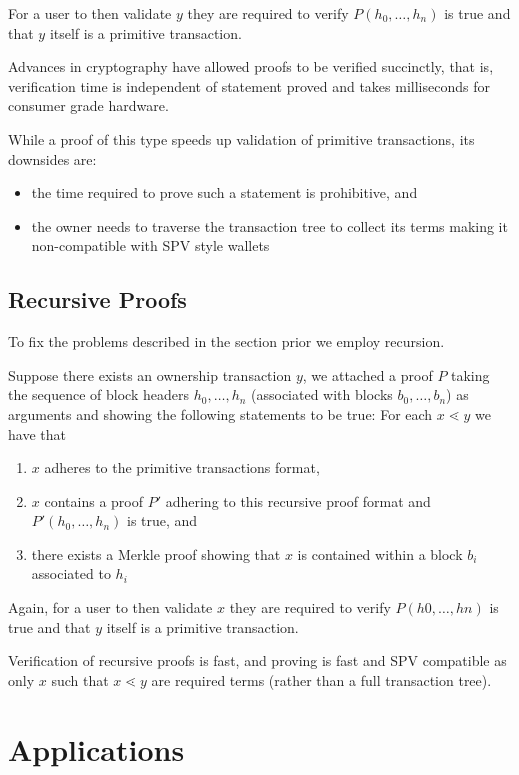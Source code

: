 \documentclass[9pt,oneside]{amsart}
\begin{document}
\begin{multicols}{2}
For a user to then validate $y$ they are required to verify $P(h_{0}, \dots, h_{n})$ is true and that $y$ itself is a primitive transaction.

Advances in cryptography have allowed proofs to be verified succinctly, that is, verification time is independent of statement proved and takes milliseconds for consumer grade hardware.

While a proof of this type speeds up validation of primitive transactions, its downsides are:
\begin{itemize}
    \item the time required to prove such a statement is prohibitive, and
    \item the owner needs to traverse the transaction tree to collect its terms making it non-compatible with SPV style wallets
\end{itemize}

\subsection{Recursive Proofs}
To fix the problems described in the section prior we employ recursion. 

Suppose there exists an ownership transaction $y$, we attached a proof $P$ taking the sequence of block headers $h_{0}, \dots, h_{n}$ (associated with blocks $b_{0}, \dots, b_{n}$) as arguments and showing the following statements to be true:
For each $x \lessdot y$ we have that
\begin{enumerate}
    \item $x$ adheres to the primitive transactions format,
    \item $x$ contains a proof $P'$ adhering to this recursive proof format and $P'(h_{0}, \dots, h_{n})$ is true, and
    \item there exists a Merkle proof showing that $x$ is contained within a block $b_{i}$ associated to $h_{i}$
\end{enumerate}

Again, for a user to then validate $x$ they are required to verify $P(h{0}, \dots, h{n})$ is true and that $y$ itself is a primitive transaction.

Verification of recursive proofs is fast, and proving is fast and SPV compatible as only $x$ such that $x \lessdot y$ are required terms (rather than a full transaction tree).

\section{Applications}

\end{multicols}
\end{document}
